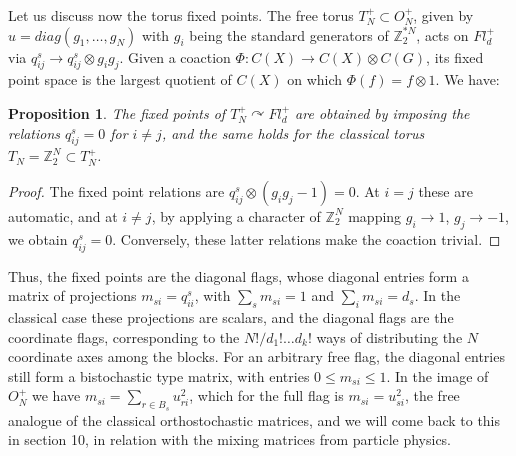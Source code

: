 \documentclass[11pt]{article}
\theoremstyle{plain}
\newtheorem{proposition}[theorem]{Proposition}
\begin{document}
\bigskip

Let us discuss now the torus fixed points. The free torus $T_N^+\subset O_N^+$, given by $u=diag(g_1,\ldots,g_N)$ with $g_i$ being the standard generators of $\mathbb Z_2^{*N}$, acts on $Fl^+_d$ via $q^s_{ij}\to q^s_{ij}\otimes g_ig_j$. Given a coaction $\Phi:C(X)\to C(X)\otimes C(G)$, its fixed point space is the largest quotient of $C(X)$ on which $\Phi(f)=f\otimes1$. We have:

\begin{proposition}
The fixed points of $T_N^+\curvearrowright Fl^+_d$ are obtained by imposing the relations $q^s_{ij}=0$ for $i\neq j$, and the same holds for the classical torus $T_N=\mathbb Z_2^N\subset T_N^+$.
\end{proposition}

\begin{proof}
The fixed point relations are $q^s_{ij}\otimes(g_ig_j-1)=0$. At $i=j$ these are automatic, and at $i\neq j$, by applying a character of $\mathbb Z_2^N$ mapping $g_i\to1$, $g_j\to-1$, we obtain $q^s_{ij}=0$. Conversely, these latter relations make the coaction trivial.
\end{proof}

Thus, the fixed points are the diagonal flags, whose diagonal entries form a matrix of projections $m_{si}=q^s_{ii}$, with $\sum_sm_{si}=1$ and $\sum_im_{si}=d_s$. In the classical case these projections are scalars, and the diagonal flags are the coordinate flags, corresponding to the $N!/d_1!\ldots d_k!$ ways of distributing the $N$ coordinate axes among the blocks. For an arbitrary free flag, the diagonal entries still form a bistochastic type matrix, with entries $0\leq m_{si}\leq1$. In the image of $O_N^+$ we have $m_{si}=\sum_{r\in B_s}u_{ri}^2$, which for the full flag is $m_{si}=u_{si}^2$, the free analogue of the classical orthostochastic matrices, and we will come back to this in section 10, in relation with the mixing matrices from particle physics.

\bigskip
\end{document}
